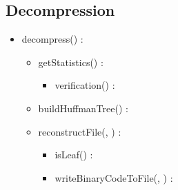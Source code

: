 \subsection{Decompression}


\begin{itemize}
    \item decompress(\binaryFile) : \binaryFile
    \begin{itemize}
        \item getStatistics(\binaryFile) : \statistics
        \begin{itemize}
            \item verification(\binaryFile) : \booleen
        \end{itemize}
        \item buildHuffmanTree(\statistics) : \huffmanTree
        \item reconstructFile(\binaryFile, \huffmanTree) : \binaryFile
        \begin{itemize}
            \item isLeaf(\huffmanTree) : \booleen
            \item writeBinaryCodeToFile(\binaryFile, \binaryCode) : \binaryFile
        \end{itemize}
    \end{itemize}
\end{itemize}
